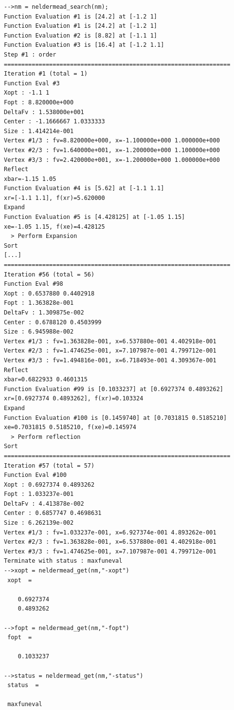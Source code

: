 \lstset{language=Scilab}
\lstset{numbers=left}
\lstset{basicstyle=\footnotesize}
\lstset{keywordstyle=\bfseries}
\begin{lstlisting}
-->nm = neldermead_search(nm);
Function Evaluation #1 is [24.2] at [-1.2 1]
Function Evaluation #1 is [24.2] at [-1.2 1]
Function Evaluation #2 is [8.82] at [-1.1 1]
Function Evaluation #3 is [16.4] at [-1.2 1.1]
Step #1 : order
=================================================================
Iteration #1 (total = 1)
Function Eval #3
Xopt : -1.1 1
Fopt : 8.820000e+000
DeltaFv : 1.538000e+001
Center : -1.1666667 1.0333333
Size : 1.414214e-001
Vertex #1/3 : fv=8.820000e+000, x=-1.100000e+000 1.000000e+000
Vertex #2/3 : fv=1.640000e+001, x=-1.200000e+000 1.100000e+000
Vertex #3/3 : fv=2.420000e+001, x=-1.200000e+000 1.000000e+000
Reflect
xbar=-1.15 1.05
Function Evaluation #4 is [5.62] at [-1.1 1.1]
xr=[-1.1 1.1], f(xr)=5.620000
Expand
Function Evaluation #5 is [4.428125] at [-1.05 1.15]
xe=-1.05 1.15, f(xe)=4.428125
  > Perform Expansion
Sort
[...]
=================================================================
Iteration #56 (total = 56)
Function Eval #98
Xopt : 0.6537880 0.4402918
Fopt : 1.363828e-001
DeltaFv : 1.309875e-002
Center : 0.6788120 0.4503999
Size : 6.945988e-002
Vertex #1/3 : fv=1.363828e-001, x=6.537880e-001 4.402918e-001
Vertex #2/3 : fv=1.474625e-001, x=7.107987e-001 4.799712e-001
Vertex #3/3 : fv=1.494816e-001, x=6.718493e-001 4.309367e-001
Reflect
xbar=0.6822933 0.4601315
Function Evaluation #99 is [0.1033237] at [0.6927374 0.4893262]
xr=[0.6927374 0.4893262], f(xr)=0.103324
Expand
Function Evaluation #100 is [0.1459740] at [0.7031815 0.5185210]
xe=0.7031815 0.5185210, f(xe)=0.145974
  > Perform reflection
Sort
=================================================================
Iteration #57 (total = 57)
Function Eval #100
Xopt : 0.6927374 0.4893262
Fopt : 1.033237e-001
DeltaFv : 4.413878e-002
Center : 0.6857747 0.4698631
Size : 6.262139e-002
Vertex #1/3 : fv=1.033237e-001, x=6.927374e-001 4.893262e-001
Vertex #2/3 : fv=1.363828e-001, x=6.537880e-001 4.402918e-001
Vertex #3/3 : fv=1.474625e-001, x=7.107987e-001 4.799712e-001
Terminate with status : maxfuneval
-->xopt = neldermead_get(nm,"-xopt")
 xopt  =
 
    0.6927374  
    0.4893262  
 
-->fopt = neldermead_get(nm,"-fopt")
 fopt  =
 
    0.1033237  
 
-->status = neldermead_get(nm,"-status")
 status  =
 
 maxfuneval   
\end{lstlisting}

